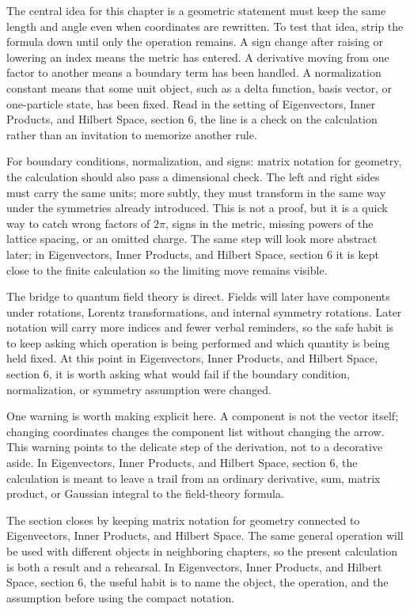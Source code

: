 The central idea for this chapter is a geometric statement must keep the same length and angle even when coordinates are rewritten.  To test that idea, strip the formula down until only the operation remains.  A sign change after raising or lowering an index means the metric has entered.  A derivative moving from one factor to another means a boundary term has been handled.  A normalization constant means that some unit object, such as a delta function, basis vector, or one-particle state, has been fixed.  Read in the setting of Eigenvectors, Inner Products, and Hilbert Space, section 6, the line is a check on the calculation rather than an invitation to memorize another rule.

For boundary conditions, normalization, and signs: matrix notation for geometry, the calculation should also pass a dimensional check.  The left and right sides must carry the same units; more subtly, they must transform in the same way under the symmetries already introduced.  This is not a proof, but it is a quick way to catch wrong factors of \(2\pi\), signs in the metric, missing powers of the lattice spacing, or an omitted charge.  The same step will look more abstract later; in Eigenvectors, Inner Products, and Hilbert Space, section 6 it is kept close to the finite calculation so the limiting move remains visible.

The bridge to quantum field theory is direct.  Fields will later have components under rotations, Lorentz transformations, and internal symmetry rotations.  Later notation will carry more indices and fewer verbal reminders, so the safe habit is to keep asking which operation is being performed and which quantity is being held fixed.  At this point in Eigenvectors, Inner Products, and Hilbert Space, section 6, it is worth asking what would fail if the boundary condition, normalization, or symmetry assumption were changed.

One warning is worth making explicit here.  A component is not the vector itself; changing coordinates changes the component list without changing the arrow.  This warning points to the delicate step of the derivation, not to a decorative aside.  In Eigenvectors, Inner Products, and Hilbert Space, section 6, the calculation is meant to leave a trail from an ordinary derivative, sum, matrix product, or Gaussian integral to the field-theory formula.

The section closes by keeping matrix notation for geometry connected to Eigenvectors, Inner Products, and Hilbert Space.  The same general operation will be used with different objects in neighboring chapters, so the present calculation is both a result and a rehearsal.  In Eigenvectors, Inner Products, and Hilbert Space, section 6, the useful habit is to name the object, the operation, and the assumption before using the compact notation.



